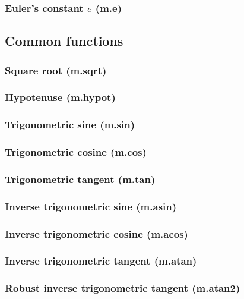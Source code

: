 \documentclass{article}
\theoremstyle{definition}
\begin{document}
\subsubsection{Euler's constant $e$ (m.e)}

\subsection{Common functions}

\subsubsection{Square root (m.sqrt)}

\subsubsection{Hypotenuse (m.hypot)}

\subsubsection{Trigonometric sine (m.sin)}

\subsubsection{Trigonometric cosine (m.cos)}

\subsubsection{Trigonometric tangent (m.tan)}

\subsubsection{Inverse trigonometric sine (m.asin)}

\subsubsection{Inverse trigonometric cosine (m.acos)}

\subsubsection{Inverse trigonometric tangent (m.atan)}

\subsubsection{Robust inverse trigonometric tangent (m.atan2)}
\end{document}

